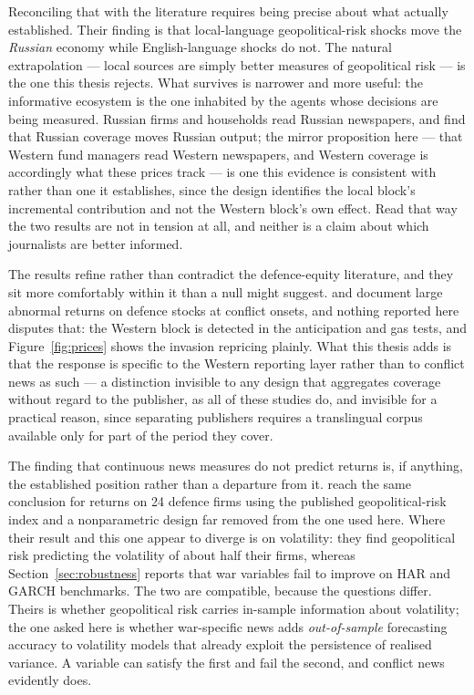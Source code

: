 \documentclass[12pt,a4paper]{article}
\begin{document}
Reconciling that with the literature requires being precise about what \citet{bondarenko2024} actually established. Their finding is that local-language geopolitical-risk shocks move the \textit{Russian} economy while English-language shocks do not. The natural extrapolation --- local sources are simply better measures of geopolitical risk --- is the one this thesis rejects. What survives is narrower and more useful: the informative ecosystem is the one inhabited by the agents whose decisions are being measured. Russian firms and households read Russian newspapers, and \citet{bondarenko2024} find that Russian coverage moves Russian output; the mirror proposition here --- that Western fund managers read Western newspapers, and Western coverage is accordingly what these prices track --- is one this evidence is consistent with rather than one it establishes, since the design identifies the local block's incremental contribution and not the Western block's own effect. Read that way the two results are not in tension at all, and neither is a claim about which journalists are better informed.

The results refine rather than contradict the defence-equity literature, and they sit more comfortably within it than a null might suggest. \citet{covachev2024europe} and \citet{klomp2025hamas} document large abnormal returns on defence stocks at conflict onsets, and nothing reported here disputes that: the Western block is detected in the anticipation and gas tests, and Figure~\ref{fig:prices} shows the invasion repricing plainly. What this thesis adds is that the response is specific to the Western reporting layer rather than to conflict news as such --- a distinction invisible to any design that aggregates coverage without regard to the publisher, as all of these studies do, and invisible for a practical reason, since separating publishers requires a translingual corpus available only for part of the period they cover.

The finding that continuous news measures do not predict returns is, if anything, the established position rather than a departure from it. \citet{apergis2018defense} reach the same conclusion for returns on 24 defence firms using the published geopolitical-risk index and a nonparametric design far removed from the one used here. Where their result and this one appear to diverge is on volatility: they find geopolitical risk predicting the volatility of about half their firms, whereas Section~\ref{sec:robustness} reports that war variables fail to improve on HAR and GARCH benchmarks. The two are compatible, because the questions differ. Theirs is whether geopolitical risk carries in-sample information about volatility; the one asked here is whether war-specific news adds \textit{out-of-sample} forecasting accuracy to volatility models that already exploit the persistence of realised variance. A variable can satisfy the first and fail the second, and conflict news evidently does.
\end{document}
